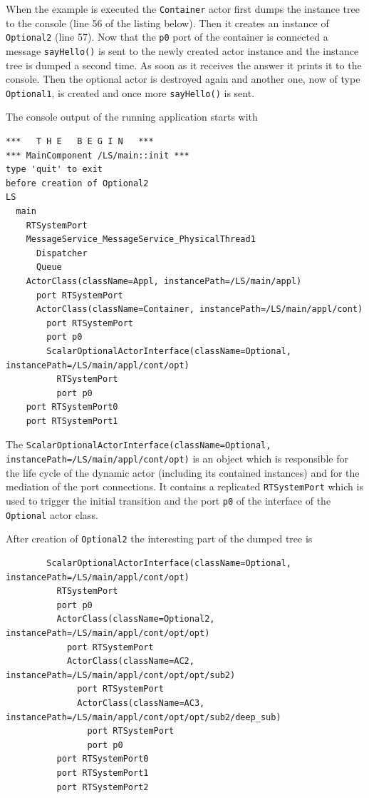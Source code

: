 When the example is executed the \texttt{Container} actor first dumps the instance tree to the console
(line 56 of the listing below).
Then it creates an instance of \texttt{Optional2} (line 57). Now that the \texttt{p0} port
of the container is connected a message \texttt{sayHello()} is sent to the newly created actor instance
and the instance tree is dumped a second time.
As soon as it receives the answer it prints it to the console. Then the optional actor is destroyed again
and another one, now of type \texttt{Optional1}, is created and once more \texttt{sayHello()} is sent.



The console output of the running application starts with

\begin{verbatim}
***   T H E   B E G I N   ***
*** MainComponent /LS/main::init ***
type 'quit' to exit
before creation of Optional2
LS
  main
    RTSystemPort
    MessageService_MessageService_PhysicalThread1
      Dispatcher
      Queue
    ActorClass(className=Appl, instancePath=/LS/main/appl)
      port RTSystemPort
      ActorClass(className=Container, instancePath=/LS/main/appl/cont)
        port RTSystemPort
        port p0
        ScalarOptionalActorInterface(className=Optional, instancePath=/LS/main/appl/cont/opt)
          RTSystemPort
          port p0
    port RTSystemPort0
    port RTSystemPort1
\end{verbatim}

The \texttt{ScalarOptionalActorInterface(className=Optional, instancePath=/LS/main/appl/cont/opt)} is an object which is
responsible for the life cycle of the dynamic actor (including its contained instances) and for the mediation of the
port connections. It contains a replicated \texttt{RTSystemPort} which is used to trigger the initial transition and the
port \texttt{p0} of the interface of the \texttt{Optional} actor class.

After creation of \texttt{Optional2} the interesting part of the dumped tree is

\begin{verbatim}
        ScalarOptionalActorInterface(className=Optional, instancePath=/LS/main/appl/cont/opt)
          RTSystemPort
          port p0
          ActorClass(className=Optional2, instancePath=/LS/main/appl/cont/opt/opt)
            port RTSystemPort
            ActorClass(className=AC2, instancePath=/LS/main/appl/cont/opt/opt/sub2)
              port RTSystemPort
              ActorClass(className=AC3, instancePath=/LS/main/appl/cont/opt/opt/sub2/deep_sub)
                port RTSystemPort
                port p0
          port RTSystemPort0
          port RTSystemPort1
          port RTSystemPort2
\end{verbatim}

